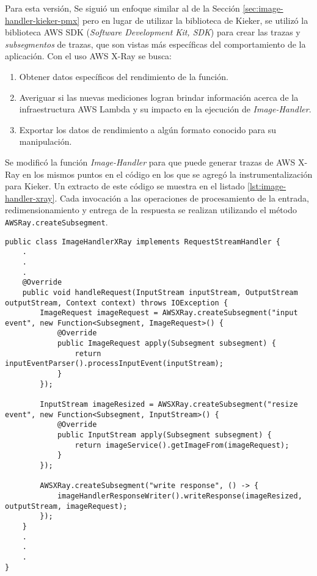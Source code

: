 Para esta versión, Se siguió un enfoque similar al de la Sección \ref{sec:image-handler-kieker-pmx} pero en lugar de utilizar la biblioteca de Kieker, se utilizó la biblioteca AWS SDK (\emph{Software Development Kit, SDK}) para crear las trazas y \emph{subsegmentos} de trazas, que son vistas más específicas del comportamiento de la aplicación. Con el uso AWS X-Ray se busca: 
\begin{enumerate}
    \item Obtener datos específicos del rendimiento de la función.
    \item Averiguar si las nuevas mediciones logran brindar información acerca de la infraestructura AWS Lambda y su impacto en la ejecución de \emph{Image-Handler}.
    \item Exportar los datos de rendimiento a algún formato conocido para su manipulación.
\end{enumerate}

Se modificó la función \emph{Image-Handler} para que puede generar trazas de AWS X-Ray en los mismos puntos en el código en los que se agregó la instrumentalización para Kieker. Un extracto de este código se muestra en el listado \ref{lst:image-handler-xray}. Cada invocación a las operaciones de procesamiento de la entrada, redimensionamiento y entrega de la respuesta se realizan utilizando el método \texttt{AWSRay.createSubsegment}.

\begin{lstlisting}[caption={Extracto de la clase \texttt{ImageHandler.java} instrumentalizada con AWS X-Ray}, label={lst:image-handler-xray}]
public class ImageHandlerXRay implements RequestStreamHandler {
    .
    .
    .
    @Override
    public void handleRequest(InputStream inputStream, OutputStream outputStream, Context context) throws IOException {
        ImageRequest imageRequest = AWSXRay.createSubsegment("input event", new Function<Subsegment, ImageRequest>() {
            @Override
            public ImageRequest apply(Subsegment subsegment) {
                return inputEventParser().processInputEvent(inputStream);
            }
        });

        InputStream imageResized = AWSXRay.createSubsegment("resize event", new Function<Subsegment, InputStream>() {
            @Override
            public InputStream apply(Subsegment subsegment) {
                return imageService().getImageFrom(imageRequest);
            }
        });

        AWSXRay.createSubsegment("write response", () -> {
            imageHandlerResponseWriter().writeResponse(imageResized, outputStream, imageRequest);
        });
    }
    .
    .
    .
}
\end{lstlisting}


